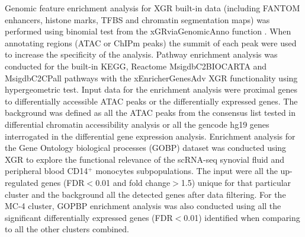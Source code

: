 Genomic feature enrichment analysis for XGR built-in data (including FANTOM enhancers, histone marks, TFBS and chromatin segmentation maps) was performed using binomial test from the xGRviaGenomicAnno function \parencite{Fang2016}. When annotating regions (ATAC or ChIPm peaks) the summit of each peak were used to increase the specificity of the analysis. Pathway enrichment analysis was conducted for the built-in KEGG, Reactome MsigdbC2BIOCARTA and MsigdbC2CPall pathways with the xEnricherGenesAdv XGR functionality using hypergeometric test. Input data for the enrichment analysis were proximal genes to differentially accessible ATAC peaks or the differentially expressed genes. The background was defined as all the ATAC peaks from the consensus list tested in differential chromatin accessibility analysis or all the gencode hg19 genes interrogated in the differential gene expression analysis. Enrichment analysis for the Gene Ontology  biological processes (GOBP) dataset was conducted using XGR to explore the functional relevance of the scRNA-seq synovial fluid and peripheral blood CD14$^+$ monocytes subpopulations. The input were all the up-regulated genes (FDR$<$0.01 and fold change$>$1.5) unique for that particular cluster and the background all the detected genes after data filtering. For the MC-4 cluster, GOPBP enrichment analysis was also conducted using all the significant differentially expressed genes (FDR$<$0.01) identified when comparing to all the other clusters combined.

